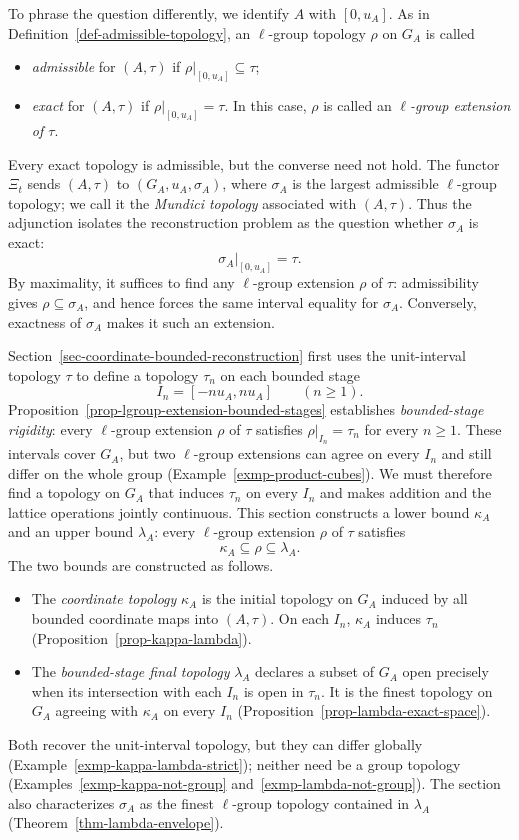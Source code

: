 \documentclass[preprint,3p]{elsarticle}
\theoremstyle{plain}
\theoremstyle{definition}
\numberwithin{equation}{section}
\begin{document}
To phrase the question differently, we identify $A$ with $[0,u_A]$.
As in Definition~\ref{def-admissible-topology}, an $\ell$-group topology
$\rho$ on $G_A$ is called
\begin{itemize}
\item \emph{admissible} for $(A,\tau)$ if
$\rho|_{[0,u_A]}\subseteq\tau$;
\item \emph{exact} for $(A,\tau)$ if
$\rho|_{[0,u_A]}=\tau$.
In this case, $\rho$ is called an \emph{$\ell$-group extension of $\tau$}.
\end{itemize}
Every exact topology is admissible, but the converse need not hold.
The functor $\Xi_t$ sends $(A,\tau)$ to $(G_A,u_A,\sigma_A)$, where
$\sigma_A$ is the largest admissible $\ell$-group topology; we call it
the \emph{Mundici topology} associated with $(A,\tau)$.
Thus the adjunction isolates the reconstruction problem as the question
whether $\sigma_A$ is exact:
\[
 \sigma_A|_{[0,u_A]}=\tau.
\]
By maximality, it suffices to find any $\ell$-group extension $\rho$
of $\tau$: admissibility gives $\rho\subseteq\sigma_A$, and hence
forces the same interval equality for $\sigma_A$.
Conversely, exactness of $\sigma_A$ makes it such an extension.

Section~\ref{sec-coordinate-bounded-reconstruction} first uses the
unit-interval topology $\tau$ to define a topology $\tau_n$ on each
bounded stage
\[
 I_n=[-nu_A,nu_A]\qquad(n\geq1).
\]
Proposition~\ref{prop-lgroup-extension-bounded-stages} establishes
\emph{bounded-stage rigidity}: every $\ell$-group extension $\rho$
of $\tau$ satisfies $\rho|_{I_n}=\tau_n$ for every $n\geq1$.
These intervals cover $G_A$, but two $\ell$-group extensions can
agree on every $I_n$ and still differ on the whole group
(Example~\ref{exmp-product-cubes}).
We must therefore find a topology on $G_A$ that induces $\tau_n$
on every $I_n$ and makes addition and the lattice operations jointly
continuous.  This section constructs a lower bound $\kappa_A$ and an
upper bound $\lambda_A$: every $\ell$-group extension $\rho$ of $\tau$
satisfies
\[
 \kappa_A\subseteq\rho\subseteq\lambda_A.
\]
The two bounds are constructed as follows.
\begin{itemize}
\item The \emph{coordinate topology} $\kappa_A$ is the initial topology
on $G_A$ induced by all bounded coordinate maps into $(A,\tau)$.
On each $I_n$, $\kappa_A$ induces $\tau_n$
(Proposition~\ref{prop-kappa-lambda}).
\item The \emph{bounded-stage final topology} $\lambda_A$ declares a
subset of $G_A$ open precisely when its intersection with each $I_n$
is open in $\tau_n$.
It is the finest topology on $G_A$ agreeing with $\kappa_A$ on every $I_n$
(Proposition~\ref{prop-lambda-exact-space}).
\end{itemize}
Both recover the unit-interval topology, but they can differ globally
(Example~\ref{exmp-kappa-lambda-strict}); neither need be a group
topology (Examples~\ref{exmp-kappa-not-group}
and~\ref{exmp-lambda-not-group}).
The section also characterizes $\sigma_A$ as the finest $\ell$-group
topology contained in $\lambda_A$
(Theorem~\ref{thm-lambda-envelope}).
\end{document}
